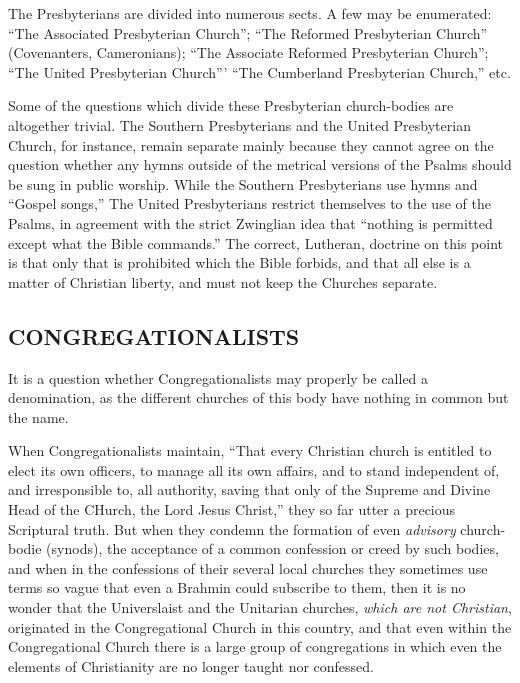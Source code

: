 \documentclass[
]{book}
\begin{document}
The Presbyterians are divided into numerous sects. A few may be enumerated: ``The Associated Presbyterian Church''; ``The Reformed Presbyterian Church'' (Covenanters, Cameronians); ``The Associate Reformed Presbyterian Church''; ``The United Presbyterian Church''' ``The Cumberland Presbyterian Church,'' etc.

Some of the questions which divide these Presbyterian church-bodies are altogether trivial. The Southern Presbyterians and the United Presbyterian Church, for instance, remain separate mainly because they cannot agree on the question whether any hymns outside of the metrical versions of the Psalms should be sung in public worship. While the Southern Presbyterians use hymns and ``Gospel songs,'' The United Presbyterians restrict themselves to the use of the Psalms, in agreement with the strict Zwinglian idea that ``nothing is permitted except what the Bible commands.'' The correct, Lutheran, doctrine on this point is that only that is prohibited which the Bible forbids, and that all else is a matter of Christian liberty, and must not keep the Churches separate.

\subsection{CONGREGATIONALISTS}\label{congregationalists}

It is a question whether Congregationalists may properly be called a denomination, as the different churches of this body have nothing in common but the name.

When Congregationalists maintain, ``That every Christian church is entitled to elect its own officers, to manage all its own affairs, and to stand independent of, and irresponsible to, all authority, saving that only of the Supreme and Divine Head of the CHurch, the Lord Jesus Christ,'' they so far utter a precious Scriptural truth. But when they condemn the formation of even \emph{advisory} church-bodie (synods), the acceptance of a common confession or creed by such bodies, and when in the confessions of their several local churches they sometimes use terms so vague that even a Brahmin could subscribe to them, then it is no wonder that the Universlaist and the Unitarian churches, \emph{which are not Christian}, originated in the Congregational Church in this country, and that even within the Congregational Church there is a large group of congregations in which even the elements of Christianity are no longer taught nor confessed.
\end{document}
